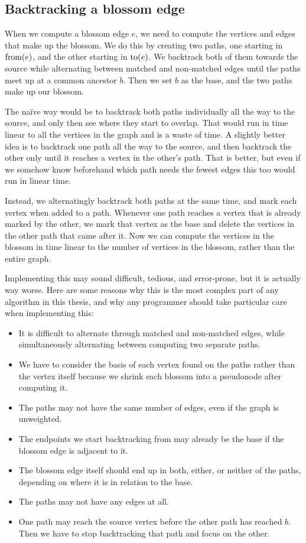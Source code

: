 \subsection{Backtracking a blossom edge}
\label{subsection:backtracking-blossom-edges}
When we compute a blossom edge $e$, we need to compute the vertices and edges that make up the blossom. We do this by creating two paths, one starting in $\operatorname{from}(e)$, and the other starting in $\operatorname{to}(e)$. We backtrack both of them towards the source while alternating between matched and non-matched edges until the paths meet up at a common ancestor $b$. Then we set $b$ as the base, and the two paths make up our blossom.

The naïve way would be to backtrack both paths individually all the way to the source, and only then see where they start to overlap. That would run in time linear to all the vertices in the graph and is a waste of time. A slightly better idea is to backtrack one path all the way to the source, and then backtrack the other only until it reaches a vertex in the other's path. That is better, but even if we somehow know beforehand which path needs the fewest edges this too would run in linear time.

Instead, we alternatingly backtrack both paths at the same time, and mark each vertex when added to a path. Whenever one path reaches a vertex that is already marked by the other, we mark that vertex as the base and delete the vertices in the other path that came after it. Now we can compute the vertices in the blossom in time linear to the number of vertices in the blossom, rather than the entire graph.

Implementing this may sound difficult, tedious, and error-prone, but it is actually way worse. Here are some reasons why this is the most complex part of any algorithm in this thesis, and why any programmer should take particular care when implementing this:
\begin{itemize}
    \item It is difficult to alternate through matched and non-matched edges, while simultaneously alternating between computing two separate paths.
    \item We have to consider the basis of each vertex found on the paths rather than the vertex itself because we shrink each blossom into a pseudonode after computing it.
    \item The paths may not have the same number of edges, even if the graph is unweighted.
    \item The endpoints we start backtracking from may already be the base if the blossom edge is adjacent to it.
    \item The blossom edge itself should end up in both, either, or neither of the paths, depending on where it is in relation to the base.
    \item The paths may not have any edges at all.
    \item One path may reach the source vertex before the other path has reached $b$. Then we have to stop backtracking that path and focus on the other.
\end{itemize}

